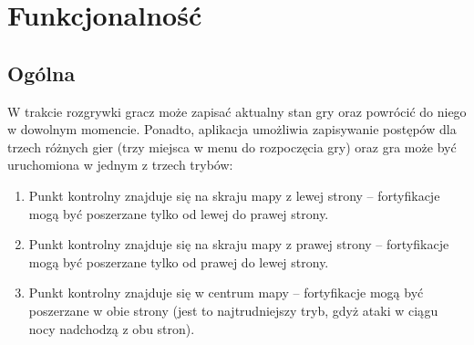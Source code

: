 \documentclass[12pt, a4paper]{article}
\begin{document}
\section{Funkcjonalność}

\subsection{Ogólna}
W trakcie rozgrywki gracz może zapisać aktualny stan gry oraz powrócić do 
niego w dowolnym momencie. Ponadto, aplikacja umożliwia zapisywanie postępów 
dla trzech różnych gier (trzy miejsca w menu do rozpoczęcia gry) oraz gra 
może być uruchomiona w jednym z trzech trybów:
\begin{enumerate}
\item Punkt kontrolny znajduje się na skraju mapy z lewej strony -- 
fortyfikacje mogą być poszerzane tylko od lewej do prawej strony.
\item Punkt kontrolny znajduje się na skraju mapy z prawej strony -- 
fortyfikacje mogą być poszerzane tylko od prawej do lewej strony.
\item Punkt kontrolny znajduje się w centrum mapy -- fortyfikacje mogą być 
poszerzane w obie strony (jest to najtrudniejszy tryb, gdyż ataki w ciągu 
nocy nadchodzą z obu stron).
\end{enumerate}
\end{document}
